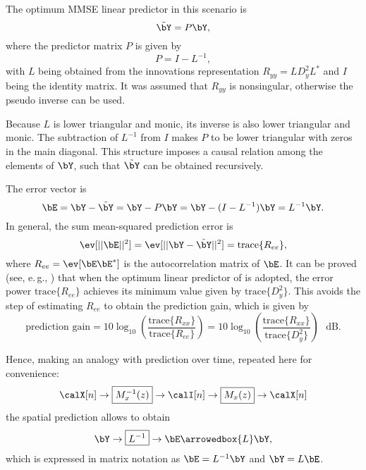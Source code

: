 The optimum MMSE linear predictor in this scenario is 
\begin{equation}
\tilde{\bY} = P \bY, 
\label{eq:matrixPredictor}
\end{equation}
where the predictor matrix $P$ is given by
\begin{equation}
P = I - L^{-1},
\label{eq:optimumPredictor}
\end{equation}
with $L$ being obtained from the innovations representation $R_{yy} = LD_y^2L^*$ and $I$ being the identity matrix. It was assumed that $R_{yy}$ is nonsingular, otherwise the pseudo inverse can be used.

Because $L$ is lower triangular and monic, its inverse is also lower triangular and monic. The subtraction of $L^{-1}$ from $I$ makes $P$ to be lower triangular with zeros in the main diagonal. This structure imposes a causal relation among the elements of $\bY$, such that 
$\tilde{\bY}$ can be obtained recursively.

The error vector is 
\begin{equation}
\bE = \bY - \tilde{\bY} = \bY - P \bY = \bY - (I - L^{-1}) \bY = L^{-1} \bY.
\end{equation}
In general, the sum mean-squared prediction error is
\begin{equation}
\ev[ || \bE ||^2] = \ev[ || \bY - \tilde{\bY} ||^2 ] = \textrm{trace} \{ R_{ee}\},
\end{equation}
where $R_{ee} = \ev[\bE \bE^*]$ is the autocorrelation matrix of $\bE$.
It can be proved (see, e.\,g., \cite{Barry04}) that when the optimum linear predictor of  is adopted, the error power $\textrm{trace} \{ R_{ee}\}$ achieves its minimum value given by 
$\textrm{trace} \{ D_y^2\}$. This avoids the step of estimating $R_{ee}$ to obtain the prediction gain, which is given by
\begin{equation}
\textrm{prediction gain} = 10 \log_{10} \left( \frac{\textrm{trace} \{ R_{xx}\}}{\textrm{trace} \{ R_{ee}\}} \right) =  10 \log_{10} \left( \frac{\textrm{trace} \{ R_{xx}\}}{\textrm{trace} \{D_y^2\}} \right)~~~\textrm{dB}.
\end{equation}

Hence, making an analogy with prediction over time, repeated here for convenience:
\[
\calX[n] \rightarrow\boxed{M_x^{-1}(z)}\rightarrow \calI[n] \rightarrow\boxed{M_x(z)}\rightarrow \calX[n] 
\]
the spatial prediction allows to obtain
\[
\bY \rightarrow\boxed{L^{-1}}\rightarrow \bE \arrowedbox{L} \bY,
\]
which is expressed in matrix notation as $\bE=L^{-1} \bY$ and $\bY=L \bE$.

